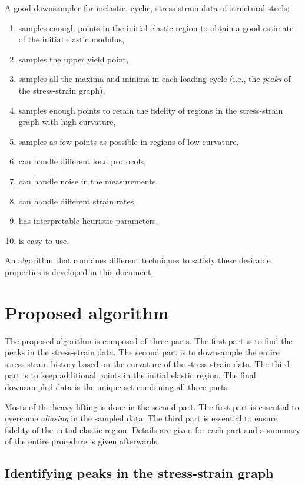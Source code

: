 \documentclass[a4paper,11pt]{article}
\begin{document}
A good downsampler for inelastic, cyclic, stress-strain data of structural steels:
\begin{enumerate}
    \item samples enough points in the initial elastic region to obtain a good estimate of the initial elastic modulus,
    \item samples the upper yield point,
    \item samples all the maxima and minima in each loading cycle (i.e., the \emph{peaks} of the stress-strain graph),
    \item samples enough points to retain the fidelity of regions in the stress-strain graph with high curvature,
    \item samples as few points as possible in regions of low curvature,
    \item can handle different load protocols,
    \item can handle noise in the measurements,
    \item can handle different strain rates,
    \item has interpretable heuristic parameters,
    \item is easy to use.
\end{enumerate}
An algorithm that combines different techniques to satisfy these desirable properties is developed in this document.

\section{Proposed algorithm}

The proposed algorithm is composed of three parts.
The first part is to find the peaks in the stress-strain data.
The second part is to downsample the entire stress-strain history based on the curvature of the stress-strain data.
The third part is to keep additional points in the initial elastic region.
The final downsampled data is the unique set combining all three parts.

Mosts of the heavy lifting is done in the second part.
The first part is essential to overcome \emph{aliasing} in the sampled data.
The third part is essential to ensure fidelity of the initial elastic region.
Details are given for each part and a summary of the entire procedure is given afterwards.


\subsection{Identifying peaks in the stress-strain graph}
\end{document}
